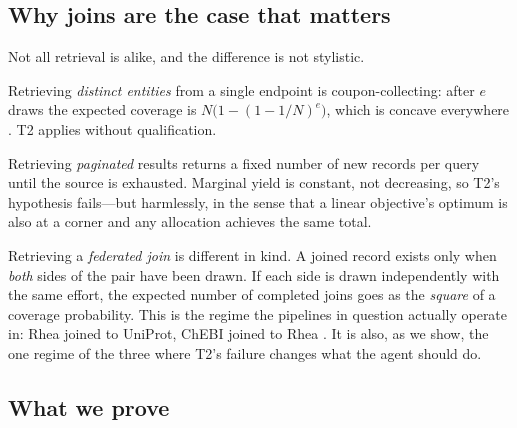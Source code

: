 \documentclass[11pt,twocolumn,a4paper]{article}
\theoremstyle{thmstyle}
\theoremstyle{definition}
\theoremstyle{remark}
\newcommand{\eff}{e}
\begin{document}
\subsection{Why joins are the case that matters}
\label{sec:whyjoins}

Not all retrieval is alike, and the difference is not stylistic.

Retrieving \emph{distinct entities} from a single endpoint is
coupon-collecting: after $\eff$ draws the expected coverage is
$N\big(1-(1-1/N)^{\eff}\big)$, which is concave everywhere
\citep{motwani1995randomized,feller1968probability}. T2 applies without
qualification.

Retrieving \emph{paginated} results returns a fixed number of new records
per query until the source is exhausted. Marginal yield is constant, not
decreasing, so T2's hypothesis fails---but harmlessly, in the sense that
a linear objective's optimum is also at a corner and any allocation
achieves the same total.

Retrieving a \emph{federated join} is different in kind. A joined record
exists only when \emph{both} sides of the pair have been drawn. If each
side is drawn independently with the same effort, the expected number of
completed joins goes as the \emph{square} of a coverage probability. This
is the regime the pipelines in question actually operate in: Rhea joined
to UniProt, ChEBI joined to Rhea
\citep{bansal2022rhea,hastings2016chebi,uniprot2023,buil2013federated}.
It is also, as we show, the one regime of the three where T2's failure
changes what the agent should do.

\subsection{What we prove}
\label{sec:contributions}
\end{document}
